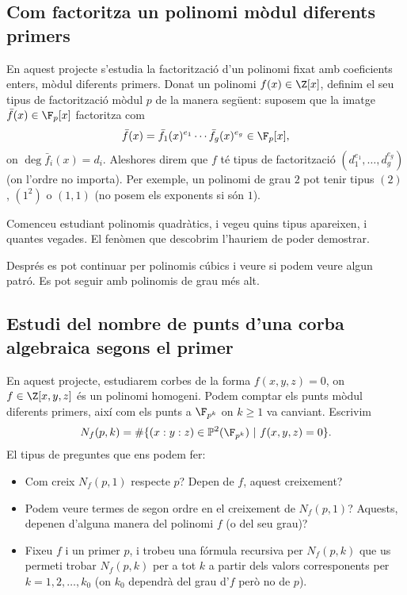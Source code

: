 \subsection{Com factoritza un polinomi mòdul diferents primers}
 
 En aquest projecte s'estudia la factorització d'un polinomi fixat amb coeficients enters, mòdul diferents primers. Donat un polinomi $f(x)\in\Z[x]$, definim el seu tipus de factorització mòdul $p$ de la manera següent: suposem que la imatge $\bar f(x)\in \F_p[x]$ factoritza com
 \[
 \bar f(x)= \bar f_1(x)^{e_1}\cdots \bar f_g(x)^{e_g}\in \F_p[x],
 \]
 on $\deg \bar f_i(x)= d_i$. Aleshores direm que $f$ té tipus de factorització $(d_1^{e_1},\ldots,d_g^{e_g})$ (on l'ordre no importa). Per exemple, un polinomi de grau $2$ pot tenir tipus $(2)$, $(1^2)$ o $(1,1)$ (no posem els exponents si són $1$).
 
 Comenceu estudiant polinomis quadràtics, i vegeu quins tipus apareixen, i quantes vegades. El fenòmen que descobrim l'hauriem de poder demostrar.
 
 Després es pot continuar per polinomis cúbics i veure si  podem veure algun patró. Es pot seguir amb polinomis de grau més alt.
 
 \subsection{Estudi del nombre de punts d'una corba algebraica segons el primer}
 
 En aquest projecte, estudiarem corbes de la forma $f(x,y,z)=0$, on $f\in\Z[x,y,z]$ és un polinomi homogeni. Podem comptar els punts mòdul diferents primers, així com els punts a $\F_{p^k}$ on $k\geq 1$ va canviant. Escrivim
 \[
 N_f(p,k) = \# \{ (x:y:z)\in\mathbb{P}^2(\F_{p^k}) ~|~ f(x,y,z) = 0\}.
 \]
 El tipus de preguntes que ens podem fer:
 \begin{itemize}
     \item Com creix $N_f(p,1)$ respecte $p$? Depen de $f$, aquest creixement?
     \item Podem veure termes de segon ordre en el creixement de $N_f(p,1)$? Aquests, depenen d'alguna manera del polinomi $f$ (o del seu grau)?
     \item Fixeu $f$ i un primer $p$, i trobeu una fórmula recursiva per $N_f(p,k)$ que us permeti trobar $N_f(p,k)$ per a tot $k$ a partir dels valors corresponents per $k=1,2,\ldots, k_0$ (on $k_0$ dependrà del grau d'$f$ però no de $p$).
 \end{itemize}
 
